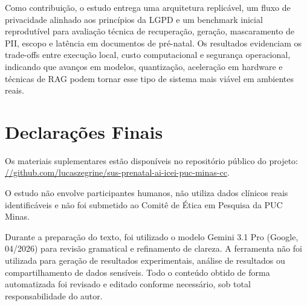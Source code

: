 \documentclass[12pt]{article}
\begin{document}

Como contribuição, o estudo entrega uma arquitetura replicável, um fluxo de privacidade alinhado aos princípios da LGPD e um benchmark inicial reprodutível para avaliação técnica de recuperação, geração, mascaramento de PII, escopo e latência em documentos de pré-natal.
Os resultados evidenciam os trade-offs entre execução local, custo computacional e segurança operacional, indicando que avanços em modelos, quantização, aceleração em hardware e técnicas de RAG podem tornar esse tipo de sistema mais viável em ambientes reais.


\section{Declarações Finais}


Os materiais suplementares estão disponíveis no repositório público do projeto: \href{https://github.com/lucaszegrine/sus-prenatal-ai-icei-puc-minas-cc}{//github.com/lucaszegrine/sus-prenatal-ai-icei-puc-minas-cc}.

O estudo não envolve participantes humanos, não utiliza dados clínicos reais identificáveis e não foi submetido ao Comitê de Ética em Pesquisa da PUC Minas. 

Durante a preparação do texto, foi utilizado o modelo Gemini 3.1 Pro (Google, 04/2026) para revisão gramatical e refinamento de clareza.
A ferramenta não foi utilizada para geração de resultados experimentais, análise de resultados ou compartilhamento de dados sensíveis.
Todo o conteúdo obtido de forma automatizada foi revisado e editado conforme necessário, sob total responsabilidade do autor.
\end{document}
